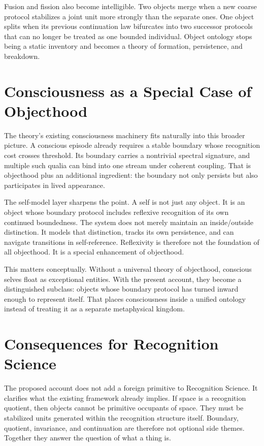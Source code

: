 \documentclass[11pt]{article}
\begin{document}
Fusion and fission also become intelligible.
Two objects merge when a new coarse protocol stabilizes a joint unit more strongly than the separate ones.
One object splits when its previous continuation law bifurcates into two successor protocols that can no longer be treated as one bounded individual.
Object ontology stops being a static inventory and becomes a theory of formation, persistence, and breakdown.

\section{Consciousness as a Special Case of Objecthood}

The theory's existing consciousness machinery fits naturally into this broader picture.
A conscious episode already requires a stable boundary whose recognition cost crosses threshold.
Its boundary carries a nontrivial spectral signature, and multiple such qualia can bind into one stream under coherent coupling.
That is objecthood plus an additional ingredient: the boundary not only persists but also participates in lived appearance.

The self-model layer sharpens the point.
A self is not just any object.
It is an object whose boundary protocol includes reflexive recognition of its own continued boundedness.
The system does not merely maintain an inside/outside distinction.
It models that distinction, tracks its own persistence, and can navigate transitions in self-reference.
Reflexivity is therefore not the foundation of all objecthood.
It is a special enhancement of objecthood.

This matters conceptually.
Without a universal theory of objecthood, conscious selves float as exceptional entities.
With the present account, they become a distinguished subclass: objects whose boundary protocol has turned inward enough to represent itself.
That places consciousness inside a unified ontology instead of treating it as a separate metaphysical kingdom.

\section{Consequences for Recognition Science}

The proposed account does not add a foreign primitive to Recognition Science.
It clarifies what the existing framework already implies.
If space is a recognition quotient, then objects cannot be primitive occupants of space.
They must be stabilized units generated within the recognition structure itself.
Boundary, quotient, invariance, and continuation are therefore not optional side themes.
Together they answer the question of what a thing is.
\end{document}
